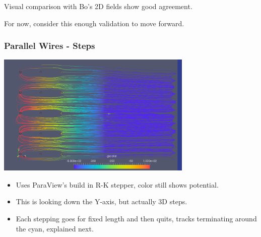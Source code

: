 \documentclass[xcolor=dvipsnames]{beamer}
\begin{document}
\begin{frame}
  \begin{center}
    Visual comparison with Bo's 2D fields show good agreement.

    For now, consider this enough validation to move forward.
  \end{center}
\end{frame}

\begin{frame}
  \frametitle{Parallel Wires - Steps}
  \begin{center}
    \includegraphics[width=0.7\textwidth]{twodee-fine-drift-steps-plan.png}    
  \end{center}
  \begin{itemize}\footnotesize
  \item Uses ParaView's build in R-K stepper, color still shows potential.
  \item This is looking down the Y-axis, but actually 3D steps.
  \item Each stepping goes for fixed length and then quits, tracks
    terminating around the cyan, explained next.
  \end{itemize}
\end{frame}
\end{document}
